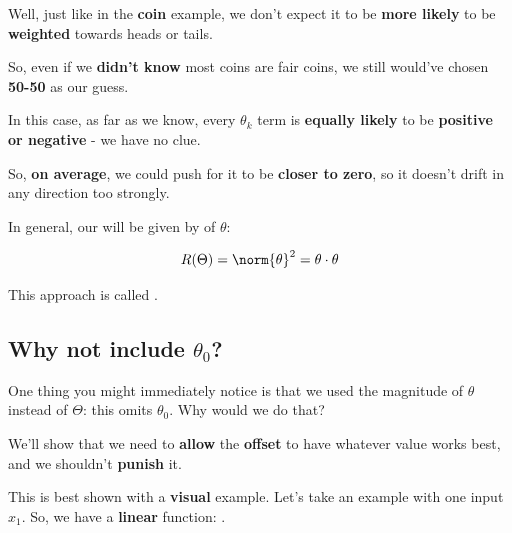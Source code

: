         Well, just like in the \textbf{coin} example, we don't expect it to be \textbf{more likely} to be \textbf{weighted} towards heads or tails.
        
        So, even if we \textbf{didn't know} most coins are fair coins, we still would've chosen \textbf{50-50} as our guess.
        
        In this case, as far as we know, every $\theta_k$ term is \textbf{equally likely} to be \textbf{positive or negative} - we have no clue.
        
        So, \textbf{on average}, we could push for it to be \textbf{closer to zero}, so it doesn't drift in any direction too strongly.\\
        
        \begin{kequation}
            In general, our  will be given by  of $\theta$:
            
            \begin{equation*}
                R(\Theta) = \norm{\theta}^2 = \theta \cdot \theta
            \end{equation*}
            
            This approach is called .
        \end{kequation}
        
        
    \subsection*{Why not include $\theta_0$?}
    
        One thing you might immediately notice is that we used the magnitude of $\theta$ instead of $\Theta$: this omits $\theta_0$. Why would we do that?
        
        We'll show that we need to \textbf{allow} the \textbf{offset} to have whatever value works best, and we shouldn't \textbf{punish} it. 
        
        This is best shown with a \textbf{visual} example. Let's take an example with one input $x_1$. So, we have a \textbf{linear} function: .
        
